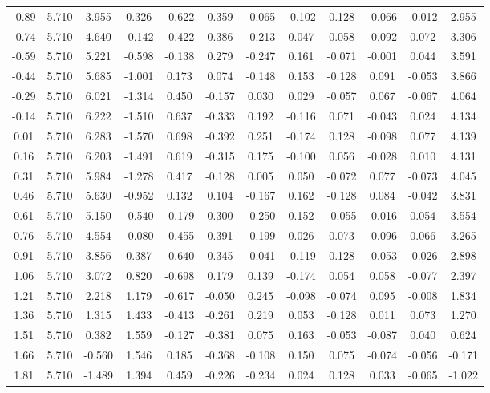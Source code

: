 {\begin{table}[H]
\begin{center}
{\begin{tabular}{|c|cccccccccc|c|}
-0.89 & 5.710 & 3.955 & 0.326 & -0.622 & 0.359 & -0.065 & -0.102 & 0.128 & -0.066 & -0.012 & 2.955 \\
-0.74 & 5.710 & 4.640 & -0.142 & -0.422 & 0.386 & -0.213 & 0.047 & 0.058 & -0.092 & 0.072 & 3.306 \\
-0.59 & 5.710 & 5.221 & -0.598 & -0.138 & 0.279 & -0.247 & 0.161 & -0.071 & -0.001 & 0.044 & 3.591 \\
-0.44 & 5.710 & 5.685 & -1.001 & 0.173 & 0.074 & -0.148 & 0.153 & -0.128 & 0.091 & -0.053 & 3.866 \\
-0.29 & 5.710 & 6.021 & -1.314 & 0.450 & -0.157 & 0.030 & 0.029 & -0.057 & 0.067 & -0.067 & 4.064 \\
-0.14 & 5.710 & 6.222 & -1.510 & 0.637 & -0.333 & 0.192 & -0.116 & 0.071 & -0.043 & 0.024 & 4.134 \\
0.01 & 5.710 & 6.283 & -1.570 & 0.698 & -0.392 & 0.251 & -0.174 & 0.128 & -0.098 & 0.077 & 4.139 \\
0.16 & 5.710 & 6.203 & -1.491 & 0.619 & -0.315 & 0.175 & -0.100 & 0.056 & -0.028 & 0.010 & 4.131 \\
0.31 & 5.710 & 5.984 & -1.278 & 0.417 & -0.128 & 0.005 & 0.050 & -0.072 & 0.077 & -0.073 & 4.045 \\
0.46 & 5.710 & 5.630 & -0.952 & 0.132 & 0.104 & -0.167 & 0.162 & -0.128 & 0.084 & -0.042 & 3.831 \\
0.61 & 5.710 & 5.150 & -0.540 & -0.179 & 0.300 & -0.250 & 0.152 & -0.055 & -0.016 & 0.054 & 3.554 \\
0.76 & 5.710 & 4.554 & -0.080 & -0.455 & 0.391 & -0.199 & 0.026 & 0.073 & -0.096 & 0.066 & 3.265 \\
0.91 & 5.710 & 3.856 & 0.387 & -0.640 & 0.345 & -0.041 & -0.119 & 0.128 & -0.053 & -0.026 & 2.898 \\
1.06 & 5.710 & 3.072 & 0.820 & -0.698 & 0.179 & 0.139 & -0.174 & 0.054 & 0.058 & -0.077 & 2.397 \\
1.21 & 5.710 & 2.218 & 1.179 & -0.617 & -0.050 & 0.245 & -0.098 & -0.074 & 0.095 & -0.008 & 1.834 \\
1.36 & 5.710 & 1.315 & 1.433 & -0.413 & -0.261 & 0.219 & 0.053 & -0.128 & 0.011 & 0.073 & 1.270 \\
1.51 & 5.710 & 0.382 & 1.559 & -0.127 & -0.381 & 0.075 & 0.163 & -0.053 & -0.087 & 0.040 & 0.624 \\
1.66 & 5.710 & -0.560 & 1.546 & 0.185 & -0.368 & -0.108 & 0.150 & 0.075 & -0.074 & -0.056 & -0.171 \\
1.81 & 5.710 & -1.489 & 1.394 & 0.459 & -0.226 & -0.234 & 0.024 & 0.128 & 0.033 & -0.065 & -1.022 \\

\end{tabular}}
\end{center}
\end{table}}
